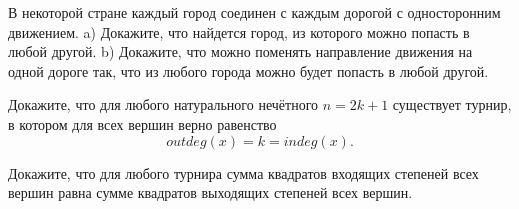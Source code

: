 \begin{exersize}
	 В некоторой стране каждый город соединен с каждым дорогой с односторонним движением. a) Докажите, что найдется город, из которого можно попасть в любой другой. b) Докажите, что можно поменять направление движения на одной дороге так, что из любого города можно будет попасть в любой другой.
\end{exersize}

\begin{exersize}
	Докажите, что для любого натурального нечётного $n = 2k + 1$ существует турнир, в котором для всех вершин верно равенство
	$$outdeg (x) = k = indeg (x).$$
\end{exersize}

\begin{exersize}
	Докажите, что для любого турнира сумма квадратов входящих степеней всех вершин равна сумме квадратов выходящих степеней всех вершин.
\end{exersize}